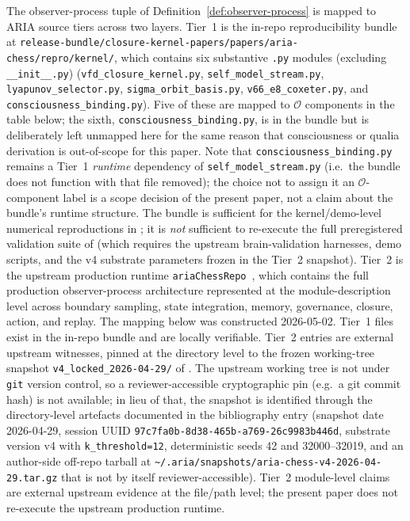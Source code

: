 \documentclass[11pt]{article}
\theoremstyle{definition}
\newcommand{\Ocal}{\mathcal{O}}
\begin{document}
The observer-process tuple of Definition~\ref{def:observer-process} is
mapped to ARIA source tiers across two layers. Tier~1 is the in-repo
reproducibility bundle at
\texttt{release-bundle/closure-kernel-papers/papers/aria-chess/repro/kernel/},
which contains six substantive \texttt{.py} modules (excluding \texttt{\_\_init\_\_.py})
(\texttt{vfd\_closure\_kernel.py}, \texttt{self\_model\_stream.py},
\texttt{lyapunov\_selector.py}, \texttt{sigma\_orbit\_basis.py},
\texttt{v66\_e8\_coxeter.py}, and
\texttt{consciousness\_binding.py}). Five of these are mapped to
$\Ocal$ components in the table below; the sixth,
\texttt{consciousness\_binding.py}, is in the bundle but is
deliberately left unmapped here for the same reason that consciousness
or qualia derivation is out-of-scope for this paper. Note that
\texttt{consciousness\_binding.py} remains a Tier~1 \emph{runtime}
dependency of \texttt{self\_model\_stream.py} (i.e.\ the bundle does
not function with that file removed); the choice not to assign it an
$\Ocal$-component label is a scope decision of the present paper, not
a claim about the bundle's runtime structure. The bundle is
sufficient for the kernel/demo-level numerical reproductions in
\cite{AriaClosureKernel}; it is \emph{not} sufficient to re-execute the
full preregistered validation suite of \cite{SmartARIAChess} (which
requires the upstream brain-validation harnesses, demo scripts, and
the v4 substrate parameters frozen in the Tier~2 snapshot). Tier~2 is the upstream production runtime
\texttt{ariaChessRepo}~\cite{ariaChessRepo}, which contains the full
production observer-process architecture represented at the module-description level across boundary
sampling, state integration, memory, governance, closure, action, and
replay. The mapping below was constructed 2026-05-02. Tier~1 files
exist in the in-repo bundle and are locally verifiable. Tier~2 entries
are external upstream witnesses, pinned at the directory level to the
frozen working-tree snapshot \texttt{v4\_locked\_2026-04-29/} of
\cite{ariaChessRepo}. The upstream working tree is not under
\texttt{git} version control, so a reviewer-accessible cryptographic
pin (e.g.\ a git commit hash) is not available; in lieu of that, the
snapshot is identified through the directory-level artefacts
documented in the bibliography entry (snapshot date 2026-04-29,
session UUID \texttt{97c7fa0b-8d38-465b-a769-26c9983b446d}, substrate
version v4 with \texttt{k\_threshold=12}, deterministic seeds 42 and
32000--32019, and an author-side off-repo tarball at
\texttt{\textasciitilde{}/.aria/snapshots/aria-chess-v4-2026-04-29.tar.gz}
that is not by itself reviewer-accessible). Tier~2 module-level
claims are external upstream evidence at the file/path level; the
present paper does not re-execute the upstream production runtime.
\end{document}
